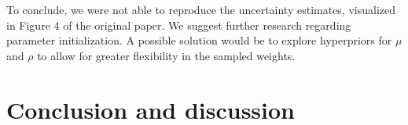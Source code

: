 \documentclass[11pt]{article}
\begin{document}
    To conclude, we were not able to reproduce the uncertainty estimates, visualized in Figure 4 of the original paper.
    We suggest further research regarding parameter initialization.
    A possible solution would be to explore hyperpriors for $\mu$ and $\rho$ to allow for greater flexibility in the sampled weights.

    \section{Conclusion and discussion}\label{sec:conclusion-and-discussion}

    
    
\end{document}
